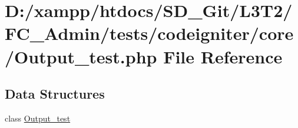 \hypertarget{_admin_2tests_2codeigniter_2core_2_output__test_8php}{}\section{D\+:/xampp/htdocs/\+S\+D\+\_\+\+Git/\+L3\+T2/\+F\+C\+\_\+\+Admin/tests/codeigniter/core/\+Output\+\_\+test.php File Reference}
\label{_admin_2tests_2codeigniter_2core_2_output__test_8php}
\subsection*{Data Structures}
\begin{DoxyCompactItemize}
\item 
class \hyperlink{class_output__test}{Output\+\_\+test}
\end{DoxyCompactItemize}
